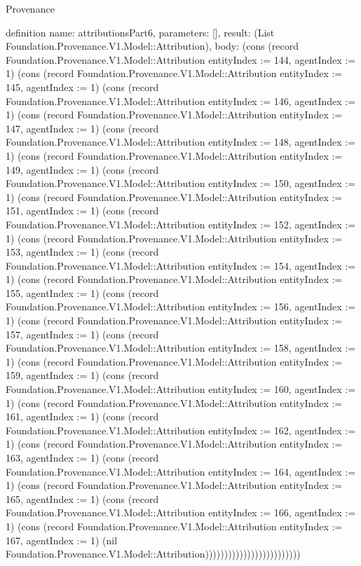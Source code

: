 \begin{lexlean}{Provenance}
\begin{semanticmodule}
definition{
  name: attributionsPart6,
  parameters: [],
  result: (List Foundation.Provenance.V1.Model::Attribution),
  body: (cons (record Foundation.Provenance.V1.Model::Attribution {entityIndex := 144, agentIndex := 1}) (cons (record Foundation.Provenance.V1.Model::Attribution {entityIndex := 145, agentIndex := 1}) (cons (record Foundation.Provenance.V1.Model::Attribution {entityIndex := 146, agentIndex := 1}) (cons (record Foundation.Provenance.V1.Model::Attribution {entityIndex := 147, agentIndex := 1}) (cons (record Foundation.Provenance.V1.Model::Attribution {entityIndex := 148, agentIndex := 1}) (cons (record Foundation.Provenance.V1.Model::Attribution {entityIndex := 149, agentIndex := 1}) (cons (record Foundation.Provenance.V1.Model::Attribution {entityIndex := 150, agentIndex := 1}) (cons (record Foundation.Provenance.V1.Model::Attribution {entityIndex := 151, agentIndex := 1}) (cons (record Foundation.Provenance.V1.Model::Attribution {entityIndex := 152, agentIndex := 1}) (cons (record Foundation.Provenance.V1.Model::Attribution {entityIndex := 153, agentIndex := 1}) (cons (record Foundation.Provenance.V1.Model::Attribution {entityIndex := 154, agentIndex := 1}) (cons (record Foundation.Provenance.V1.Model::Attribution {entityIndex := 155, agentIndex := 1}) (cons (record Foundation.Provenance.V1.Model::Attribution {entityIndex := 156, agentIndex := 1}) (cons (record Foundation.Provenance.V1.Model::Attribution {entityIndex := 157, agentIndex := 1}) (cons (record Foundation.Provenance.V1.Model::Attribution {entityIndex := 158, agentIndex := 1}) (cons (record Foundation.Provenance.V1.Model::Attribution {entityIndex := 159, agentIndex := 1}) (cons (record Foundation.Provenance.V1.Model::Attribution {entityIndex := 160, agentIndex := 1}) (cons (record Foundation.Provenance.V1.Model::Attribution {entityIndex := 161, agentIndex := 1}) (cons (record Foundation.Provenance.V1.Model::Attribution {entityIndex := 162, agentIndex := 1}) (cons (record Foundation.Provenance.V1.Model::Attribution {entityIndex := 163, agentIndex := 1}) (cons (record Foundation.Provenance.V1.Model::Attribution {entityIndex := 164, agentIndex := 1}) (cons (record Foundation.Provenance.V1.Model::Attribution {entityIndex := 165, agentIndex := 1}) (cons (record Foundation.Provenance.V1.Model::Attribution {entityIndex := 166, agentIndex := 1}) (cons (record Foundation.Provenance.V1.Model::Attribution {entityIndex := 167, agentIndex := 1}) (nil Foundation.Provenance.V1.Model::Attribution)))))))))))))))))))))))))
}


\end{semanticmodule}
\end{lexlean}
